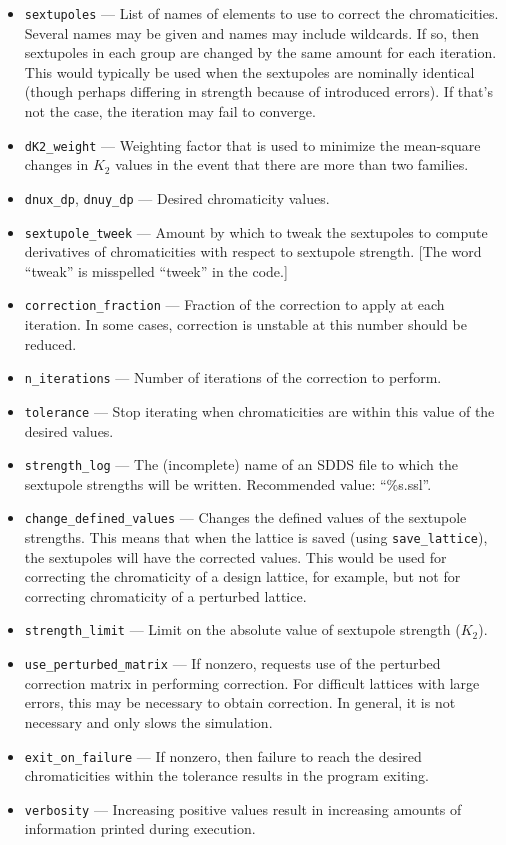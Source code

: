 \documentclass[11pt]{article}
\begin{document}
\begin{itemize}
\item \verb|sextupoles| --- List of names of elements to use to correct the chromaticities.  Several names may be given and names may include
  wildcards. If so, then sextupoles in each group are changed by the same amount for each iteration.
  This would typically be used when the sextupoles are nominally identical (though perhaps differing in strength because of
  introduced errors). If that's not the case, the iteration may fail to converge.
\item \verb|dK2_weight| --- Weighting factor that is used to minimize the mean-square changes in $K_2$ values in the
  event that there are more than two families.
\item \verb|dnux_dp|, \verb|dnuy_dp| --- Desired chromaticity values.
\item \verb|sextupole_tweek| --- Amount by which to tweak the sextupoles to compute derivatives of
chromaticities with respect to sextupole strength.  [The word ``tweak'' is misspelled ``tweek'' in the code.]
\item \verb|correction_fraction| --- Fraction of the correction to apply at each iteration.  In some
cases, correction is unstable at this number should be reduced.
\item \verb|n_iterations| --- Number of iterations of the correction to perform.
\item \verb|tolerance| --- Stop iterating when chromaticities are within this value of the
desired values.
\item \verb|strength_log| --- The (incomplete) name of an SDDS file to which the sextupole strengths will
be written.  Recommended value: ``\%s.ssl''.
\item \verb|change_defined_values| --- Changes the defined values of the sextupole strengths.
This means that when the lattice is saved (using \verb|save_lattice|), the sextupoles will
have the corrected values.  This would be used for correcting the chromaticity of a design
lattice, for example, but not for correcting chromaticity of a perturbed lattice.
\item \verb|strength_limit| --- Limit on the absolute value of sextupole strength ($K_2$).
\item \verb|use_perturbed_matrix| --- If nonzero, requests use of the perturbed correction matrix in
performing correction.  For difficult lattices with large errors, this may be necessary
to obtain correction.  In general, it is not necessary and only slows the simulation.
\item \verb|exit_on_failure| --- If nonzero, then failure to reach the desired chromaticities within the
  tolerance results in the program exiting.
\item \verb|verbosity| --- Increasing positive values result in increasing amounts of information printed during
  execution.
\end{itemize}
\end{document}

